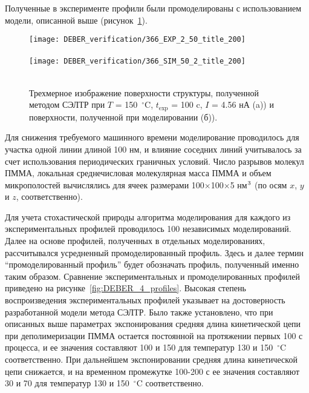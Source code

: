 Полученные в эксперименте профили были промоделированы с использованием модели, описанной выше (рисунок~\ref{fig:DEBER_3D_sim}).
\begin{figure}[h!]
	\begin{center}
		\texttt{[image: DEBER\_verification/366\_EXP\_2\_50\_title\_200]} \\
		\vspace{-10.7em}  \vspace{9.7em} \\
		\vspace{-1em}
		\texttt{[image: DEBER\_verification/366\_SIM\_50\_2\_title\_200]} \\
		\vspace{-10.7em}  \vspace{10.7em} \\
	\end{center}
	\vspace{-2em}
	\caption{Трехмерное изображение поверхности структуры, полученной методом СЭЛТР при $T$ = 150~$^\circ$C, $t_\mathrm{exp}$ = 100 c, $I$ = 4.56 нА (a)) и поверхности, полученной при моделировании (б)).}
	\label{fig:DEBER_3D_sim}
\end{figure}
Для снижения требуемого машинного времени моделирование проводилось для участка одной линии длиной 100 нм, и влияние соседних линий учитывалось за счет использования периодических граничных условий. Число разрывов молекул ПММА, локальная среднечисловая молекулярная масса ПММА и объем микрополостей вычислялись для ячеек размерами 100$\times$100$\times$5 нм$^\text{3}$ (по осям $x$, $y$ и $z$, соответственно).

Для учета стохастической природы алгоритма моделирования для каждого из экспериментальных профилей проводилось 100 независимых моделирований. Далее на основе профилей, полученных в отдельных моделированиях, рассчитывался усредненный промоделированный профиль. Здесь и далее термин ``промоделированный профиль'' будет обозначать профиль, полученный именно таким образом. Сравнение экспериментальных и промоделированных профилей приведено на рисунке~\ref{fig:DEBER_4_profiles}. Высокая степень воспроизведения экспериментальных профилей указывает на достоверность разработанной модели метода СЭЛТР. Было также установлено, что при описанных выше параметрах экспонирования средняя длина кинетической цепи при деполимеризации ПММА остается постоянной на протяжении первых 100 с процесса, и ее значения составляют 100 и 150 для температур 130 и 150~$^\circ$C соответственно. При дальнейшем экспонировании средняя длина кинетической цепи снижается, и на временном промежутке 100-200 с ее значения составляют 30 и 70 для температур 130 и 150~$^\circ$C соответственно.

